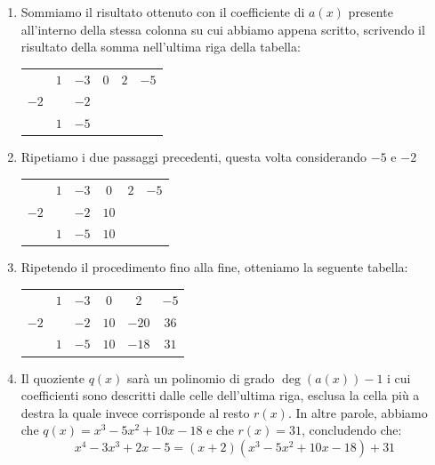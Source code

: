 \documentclass[a4paper, 12pt]{report}
\begin{document}
\begin{enumerate}
        \item Sommiamo il risultato ottenuto con il coefficiente di $a(x)$ presente all'interno della stessa colonna su cui abbiamo appena scritto, scrivendo il risultato della somma nell'ultima riga della tabella:
        
        \begin{center}
            \begin{tabular}{c | c c c c | c}
                 & $1$ & $-3$ & $0$ & $2$ & $-5$\\
            $-2$ &       & $-2$ &  & & \\
            \hline
                &  $1$ & $-5$ &  &  & \\
            \end{tabular}
        \end{center}

        \item Ripetiamo i due passaggi precedenti, questa volta considerando $-5$ e $-2$
        
        \begin{center}
            \begin{tabular}{c | c c c c | c}
                 & $1$ & $-3$ & $0$ & $2$ & $-5$\\
            $-2$ &       & $-2$ & $10$ & & \\
            \hline
                &  $1$ & $-5$ & $10$ &  & \\
            \end{tabular}
        \end{center}

        \item Ripetendo il procedimento fino alla fine, otteniamo la seguente tabella:
        \begin{center}
            \begin{tabular}{c | c c c c | c}
                 & $1$ & $-3$ & $0$ & $2$ & $-5$\\
            $-2$ &       & $-2$ & $10$ & $-20$ & $36$\\
            \hline
                & $1$ & $-5$ & $10$ & $-18$ & $31$\\
            \end{tabular}
        \end{center}

        \item Il quoziente $q(x)$ sarà un polinomio di grado $\deg(a(x)) - 1$ i cui coefficienti sono descritti dalle celle dell'ultima riga, esclusa la cella più a destra la quale invece corrisponde al resto $r(x)$. In altre parole, abbiamo che $q(x) = x^3-5x^2+10x-18$ e che $r(x) = 31$, concludendo che:
        \[ x^4-3x^3+2x-5 = (x+2)(x^3-5x^2+10x-18)+31\]
    \end{enumerate}
\end{document}

